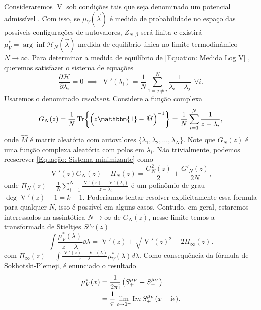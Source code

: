 \documentclass[11pt,twocolumn]{article}
\newcommand{\matriz}[1]{\hat#1}
\newcommand{\mmany}[2]{ #1_1, #1_2, \dots, #1_#2 }
\DeclareMathOperator{\V}{V}
\renewcommand{\Im}{\mathop{\textrm Im}}
\newcommand{\ii}{\mathrm{i}}
\numberwithin{equation}{section} %
\begin{document}
Consideraremos $\V$ sob condições tais que seja denominado um potencial admissível \cite{ChafaCoulombMeasure}. Com isso, se $\mu_{V}(\vec{\lambda})$ é medida de probabilidade no espaço das possíveis configurações de autovalores, $Z_{N, \beta}$ será finita e existirá $\mu_{V}^* = \arg \inf {\mathcal{H}_N(\vec{\lambda})}$ medida de equilíbrio única no limite termodinâmico $N \rightarrow \infty$. Para determinar a medida de equilíbrio de \ref{Equation: Medida Log V} \cite{RMT-firstcourse-Potters}, queremos satisfazer o sistema de equações
\begin{equation}
	\frac{\partial \mathcal{H}}{\partial \lambda_i} = 0 \ \implies \ \V'(\lambda_i) = \frac{1}{N} \sum_{1 = j \neq i}^{N} \frac{1}{\lambda_i - \lambda_j} \ \ \forall i.
	\label{Equação: Sistema minimizante}
\end{equation} 
Usaremos o denominado \textit{resolvent}. Considere a função complexa $$G_N(z) = \frac{1}{N} \Tr{\left(z \mathbbm{1} - \matriz{M}\right)^{-1}} = \frac{1}{N} \sum_{i=1}^{N} \frac{1}{z - \lambda_i},$$ onde $\matriz{M}$ é matriz aleatória com autovalores $\{\mmany{\lambda}{N}\}$. Note que $G_N(z)$ é uma função complexa aleatória com polos em $\lambda_i$. Não trivialmente, podemos reescrever \ref{Equação: Sistema minimizante} como $$\V'(z) G_N(z) - \Pi_N(z) = \frac{G_N^2(z)}{2} + \frac{G'_N(z)}{2N},$$ onde $\Pi_N(z) = \frac{1}{N} \sum_{i = 1}^{N} \frac{\V'(z) - \V'(\lambda_i)}{z - \lambda_i}$ é um polinômio de grau $\deg{\V'(z)} - 1 = k - 1$. Poderíamos tentar resolver explicitamente essa formula para qualquer $N$, isso é possível em alguns casos. Contudo, em geral, estaremos interessados na assintótica $N \to \infty$ de $G_N(z)$, nesse limite temos a transformada de Stieltjes $S^{\mu_V}(z)$
\begin{equation}
	\int \frac{\mu^*_V(\lambda)}{z - \lambda} \dd \lambda= \V'(z) \pm \sqrt{\V'(z)^2 - 2 \Pi_{\infty}(z) }.
	\label{Equation: Resolvent}
\end{equation}
com $\Pi_{\infty}(z) = \int \frac{\V'(z) - \V'(\lambda)}{z - \lambda} \mu^*_V(\lambda) d\lambda$. Como consequência da fórmula de Sokhotski-Plemeji, é enunciado o resultado 
\begin{equation}
	\begin{split}
		\mu^{*}_{V}(x) 
		&= \frac{1}{2\pi \ii} \left( S^{\mu_V}_{+} -  S^{\mu_V}_{-}\right) \\
		&= \frac{1}{\pi} \lim_{\epsilon \to 0^+} \Im{S^{\mu_V}_{+}(x + \ii\epsilon)}.
	\end{split}
	\label{Equation: p(lambda)}
\end{equation}
\end{document}
